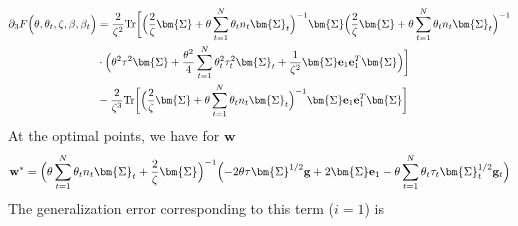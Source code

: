 \documentclass[final]{l4dc2026}
\newcommand{\bSigma}{\bm{\Sigma}}
\newcommand{\be}{\mathbf{e}}
\newcommand{\bg}{\mathbf{g}}
\newcommand{\bh}{\mathbf{h}}
\newcommand{\bw}{\mathbf{w}}
\newcommand{\tr}{\text{Tr}}
\begin{document}
\begin{align}
      \partial_3 F\Bigl(\theta, \theta_t, \zeta, \beta, \beta_t\Bigr) &= \frac{2}{\zeta^2} \tr \biggl[ \Bigl(\frac{2}{\zeta}\bSigma+\theta\sum_{t=1}^N \theta_t n_t \bSigma_t \Bigr)^{-1} \bSigma  \Bigl(\frac{2}{\zeta}\bSigma+\theta\sum_{t=1}^N \theta_t n_t \bSigma_t \Bigr)^{-1} \nonumber\\
      &\cdot \Bigl(\theta^2 \tau^2 \bSigma + \frac{\theta^2}{4} \sum_{t=1}^N \theta^2_t \tau_t^2 \bSigma_t  + \frac{1}{\zeta^2}\bSigma \be_1 \be_1^T \bSigma\Bigr) \biggr] \nonumber \\
      &- \frac{2}{\zeta^3} \tr\bigg[\Bigl(\frac{2}{\zeta}\bSigma+\theta\sum_{t=1}^N \theta_t n_t \bSigma_t \Bigr)^{-1}  \bSigma \be_1 \be_1^T \bSigma\biggr]
\end{align}
At the optimal points, we have for $\bw$
\begin{align*}
    \bw^\ast =  \Bigl(  \theta \sum_{t=1}^N \theta_t n_t \bSigma_t + \frac{2}{\zeta} \bSigma \Bigr)^{-1} \Bigl( - 2 \theta \tau \bSigma^{1/2} \bg + 2 \bSigma \be_1 -  \theta \sum_{t=1}^N \theta_t \tau_t \bSigma_t^{1/2}\bg_t \Bigr)
\end{align*}
The generalization error corresponding to this term ($i=1$) is
\end{document}
